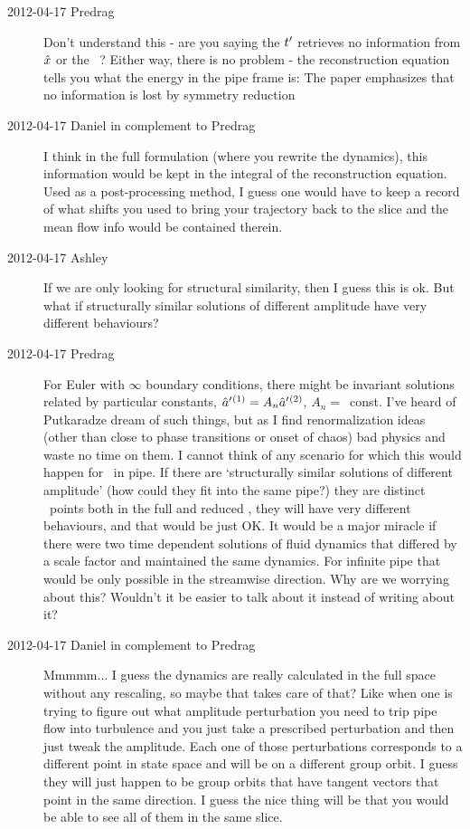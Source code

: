\begin{description}
\item[2012-04-17 Predrag] Don't understand this - are you saying the
$t'_{}$ retrieves no information from $\hat{x}$ or the \template\
\slicep? Either way, there is no problem - the reconstruction equation
tells you what the energy in the pipe frame is: The paper\rf{atlas12}
emphasizes that no information is lost by symmetry reduction

\item[2012-04-17 Daniel in complement to Predrag] I think in the full
formulation (where you rewrite the dynamics), this information would be
kept in the integral of the reconstruction equation. Used as a
post-processing method, I guess one would have to keep a record of what
shifts you used to bring your trajectory back to the slice and the mean
flow info would be contained therein.

\item[2012-04-17 Ashley]
If we are only looking for structural similarity, then I guess this is
ok.  But what if structurally similar solutions of different amplitude
have very different behaviours?

\item[2012-04-17 Predrag] For Euler with $\infty$ boundary conditions,
there might be invariant solutions related by particular constants,
$\hat{a}'{}^{(1)} = A_n \hat{a}'{}^{(2)}  $, $A_n=$~const. I've heard of
Putkaradze dream of such things, but as I find renormalization ideas
(other than close to phase transitions or onset of chaos) bad physics and
waste no time on them. I cannot think of any scenario for which this
would happen for \NSe\ in pipe. If there are `structurally similar
solutions of different amplitude' (how could they fit into the same
pipe?) they are distinct \statesp\ points both in the full and reduced
\statesp, they will have very different behaviours, and that would be
just OK. It would be a major miracle if there were two time dependent
solutions of fluid dynamics that differed by a scale factor and
maintained the same dynamics. For infinite pipe that would be only
possible in the streamwise direction. Why are we worrying about this?
Wouldn't it be easier to talk about it instead of writing about it?

\item[2012-04-17 Daniel in complement to Predrag] Mmmmm... I guess the
dynamics are really calculated in the full space without any rescaling,
so maybe that takes care of that? Like when one is trying to figure out
what amplitude perturbation you need to trip pipe flow into turbulence
and you just take a prescribed perturbation and then just tweak the
amplitude. Each one of those perturbations corresponds to a different
point in state space and will be on a different group orbit. I guess they
will just happen to be group orbits that have tangent vectors that point
in the same direction. I guess the nice thing will be that you would be
able to see all of them in the same slice.


\end{description}
